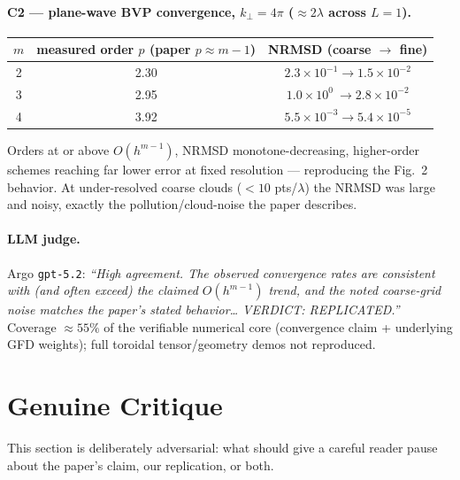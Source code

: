 \documentclass[11pt]{article}
\begin{document}
\paragraph{C2 --- plane-wave BVP convergence, $k_\perp=4\pi$ ($\approx 2\lambda$ across $L=1$).}
\begin{center}\small
\begin{tabular}{ccc}
\toprule
$m$ & measured order $p$ (paper $p\approx m-1$) & NRMSD (coarse $\to$ fine) \\
\midrule
2 & 2.30 & $2.3\!\times\!10^{-1}\to 1.5\!\times\!10^{-2}$ \\
3 & 2.95 & $1.0\!\times\!10^{0}\ \to 2.8\!\times\!10^{-2}$ \\
4 & 3.92 & $5.5\!\times\!10^{-3}\to 5.4\!\times\!10^{-5}$ \\
\bottomrule
\end{tabular}
\end{center}
Orders at or above $O(h^{m-1})$, NRMSD monotone-decreasing, higher-order
schemes reaching far lower error at fixed resolution --- reproducing the
Fig.~2 behavior. At under-resolved coarse clouds ($<10$ pts/$\lambda$) the
NRMSD was large and noisy, exactly the pollution/cloud-noise the paper
describes.

\paragraph{LLM judge.}
Argo \texttt{gpt-5.2}: \emph{``High agreement. The observed convergence rates
are consistent with (and often exceed) the claimed $O(h^{m-1})$ trend, and
the noted coarse-grid noise matches the paper's stated behavior\ldots
VERDICT: REPLICATED.''} Coverage $\approx 55\%$ of the verifiable numerical
core (convergence claim + underlying GFD weights); full toroidal
tensor/geometry demos not reproduced.

\section{Genuine Critique}
\label{sec:critique}
This section is deliberately adversarial: what should give a careful reader
pause about the paper's claim, our replication, or both.
\end{document}
